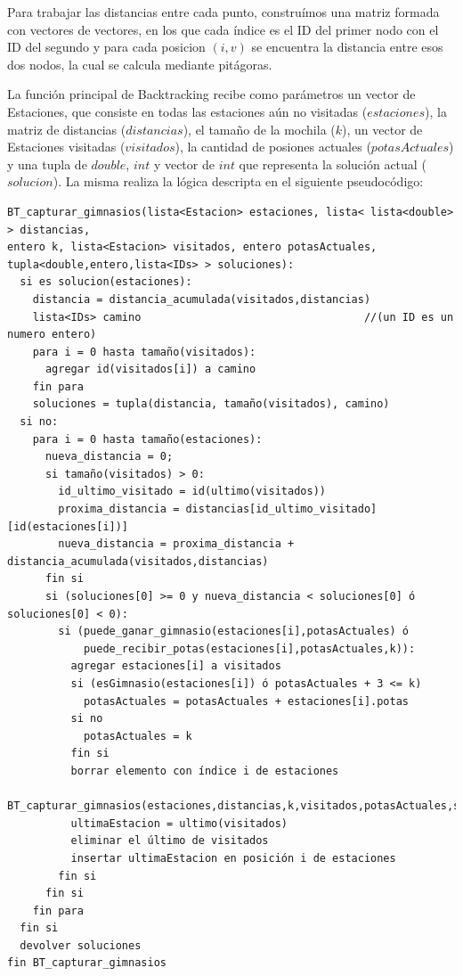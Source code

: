             Para trabajar las distancias entre cada punto, construímos una matriz formada con vectores de vectores, en los que cada índice es el ID del primer nodo con el ID del segundo y para cada posicion $(i,v)$ se encuentra la distancia entre esos dos nodos, la cual se calcula mediante pitágoras.

            La función principal de Backtracking recibe como parámetros un vector de Estaciones, que consiste en todas las estaciones aún no visitadas ($estaciones$), la matriz de distancias ($distancias$), el tamaño de la mochila ($k$), un vector de Estaciones visitadas ($visitados$), la cantidad de posiones actuales ($potasActuales$) y una tupla de $double$, $int$ y vector de $int$ que representa la solución actual ($solucion$). La misma realiza la lógica descripta en el siguiente pseudocódigo:

            \begin{codesnippet}
            \begin{verbatim}
BT_capturar_gimnasios(lista<Estacion> estaciones, lista< lista<double> > distancias,
entero k, lista<Estacion> visitados, entero potasActuales,
tupla<double,entero,lista<IDs> > soluciones):
  si es solucion(estaciones):
    distancia = distancia_acumulada(visitados,distancias)
    lista<IDs> camino                                   //(un ID es un numero entero)
    para i = 0 hasta tamaño(visitados):
      agregar id(visitados[i]) a camino
    fin para
    soluciones = tupla(distancia, tamaño(visitados), camino)
  si no:
    para i = 0 hasta tamaño(estaciones):
      nueva_distancia = 0;
      si tamaño(visitados) > 0:
        id_ultimo_visitado = id(ultimo(visitados))
        proxima_distancia = distancias[id_ultimo_visitado][id(estaciones[i])]
        nueva_distancia = proxima_distancia + distancia_acumulada(visitados,distancias)
      fin si
      si (soluciones[0] >= 0 y nueva_distancia < soluciones[0] ó soluciones[0] < 0):
        si (puede_ganar_gimnasio(estaciones[i],potasActuales) ó
            puede_recibir_potas(estaciones[i],potasActuales,k)):
          agregar estaciones[i] a visitados
          si (esGimnasio(estaciones[i]) ó potasActuales + 3 <= k)
            potasActuales = potasActuales + estaciones[i].potas
          si no
            potasActuales = k
          fin si
          borrar elemento con índice i de estaciones
          BT_capturar_gimnasios(estaciones,distancias,k,visitados,potasActuales,soluciones)
          ultimaEstacion = ultimo(visitados)
          eliminar el último de visitados
          insertar ultimaEstacion en posición i de estaciones
        fin si
      fin si
    fin para
  fin si
  devolver soluciones
fin BT_capturar_gimnasios
            \end{verbatim}
            \end{codesnippet}

